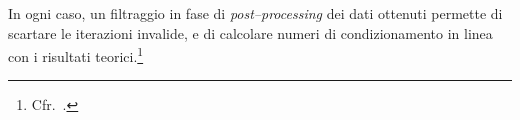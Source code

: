 In ogni caso, un filtraggio in fase di \emph{post--processing} dei dati ottenuti permette di scartare le iterazioni
invalide, e di calcolare numeri di condizionamento in linea con i risultati teorici.\footnote{Cfr.~\cite{demmel}.}





